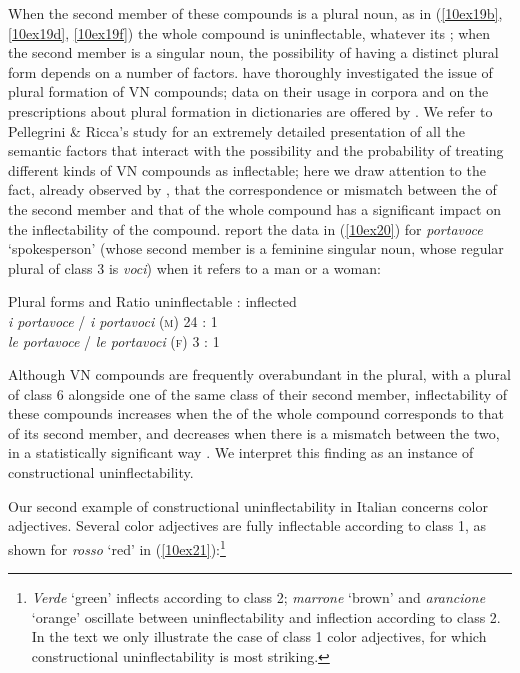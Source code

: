 \documentclass[output=paper,colorlinks,citecolor=brown]{langscibook}
\begin{document}
When the second member of these compounds is a plural noun, as in (\ref{10ex19b}, \ref{10ex19d}, \ref{10ex19f}) the whole compound is uninflectable, whatever its ; when the second member is a singular noun, the possibility of having a distinct plural form depends on a number of factors. \citet{pellegriniricca2019} have thoroughly investigated the issue of plural formation of VN compounds; data on their usage in corpora and on the prescriptions about plural formation in dictionaries are offered by \citet{micheli2016}. We refer to Pellegrini \& Ricca's study for an extremely detailed presentation of all the semantic factors that interact with the possibility and the probability of treating different kinds of VN compounds as inflectable; here we draw attention to the fact, already observed by \citet[110--112]{pellegriniricca2019}, that the correspondence or mismatch between the  of the second member and that of the whole compound has a significant impact on the inflectability of the compound. \citet[110]{pellegriniricca2019} report the data in (\ref{10ex20}) for \emph{portavoce} `spokesperson' (whose second member is a feminine singular noun, whose regular plural of class 3 is \emph{voci}) when it refers to a man or a woman:

\begin{exe}
	\ex \label{10ex20}
		Plural forms and  \hspace*{1.5cm} Ratio uninflectable : inflected \\
		\emph{i portavoce} / \emph{i portavoci} (\textsc{m}) \hspace*{2.2cm} 24 : 1 \\
		\emph{le portavoce} / \emph{le portavoci} (\textsc{f}) \hspace*{2.155cm} 3 : 1
\end{exe}

Although VN compounds are frequently overabundant in the plural, with a plural of class 6 alongside one of the same class of their second member, inflectability of these compounds increases when the  of the whole compound corresponds to that of its second member, and decreases when there is a  mismatch between the two, in a statistically significant way \citep[110--112]{pellegriniricca2019}. We interpret this finding as an instance of constructional uninflectability.

Our second example of constructional uninflectability in Italian concerns color adjectives. Several color adjectives are fully inflectable according to class 1, as shown for \emph{rosso} `red' in (\ref{10ex21}):\footnote{\emph{Verde} `green' inflects according to class 2; \emph{marrone} `brown' and \emph{arancione} `orange' oscillate between uninflectability and inflection according to class 2. In the text we only illustrate the case of class 1 color adjectives, for which constructional uninflectability is most striking.}
\end{document}
